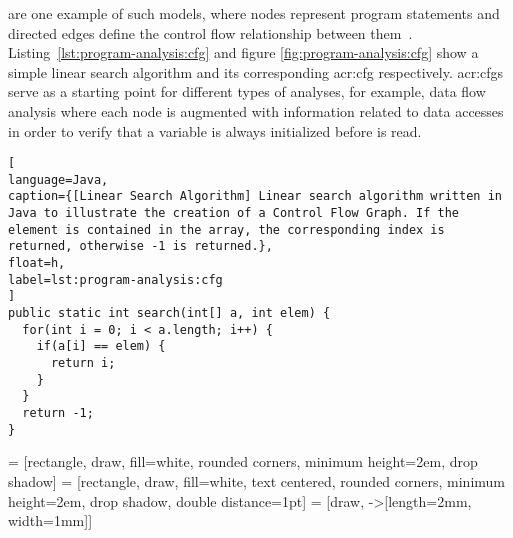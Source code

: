 \textit{} are one example of such models, where nodes represent program statements and directed edges define the control flow relationship between them~\cite{Allen1970}. Listing~\ref{lst:program-analysis:cfg} and figure \ref{fig:program-analysis:cfg} show a simple linear search algorithm and its corresponding \acrlong{acr:cfg} respectively. \acrshort{acr:cfg}s serve as a starting point for different types of analyses, for example, data flow analysis where each node is augmented with information related to data accesses in order to verify that a variable is always initialized before is read. 

\begin{lstlisting}[
language=Java,
caption={[Linear Search Algorithm] Linear search algorithm written in Java to illustrate the creation of a Control Flow Graph. If the element is contained in the array, the corresponding index is returned, otherwise -1 is returned.},
float=h,
label=lst:program-analysis:cfg
]
public static int search(int[] a, int elem) {
  for(int i = 0; i < a.length; i++) {
    if(a[i] == elem) {
      return i;
    }
  }
  return -1;
}
\end{lstlisting}

 = [rectangle, draw, fill=white, rounded corners, minimum height=2em, drop shadow]
 = [rectangle, draw, fill=white, text centered, rounded corners, minimum height=2em, drop shadow, double distance=1pt]
 = [draw, -{>[length=2mm, width=1mm]}]

